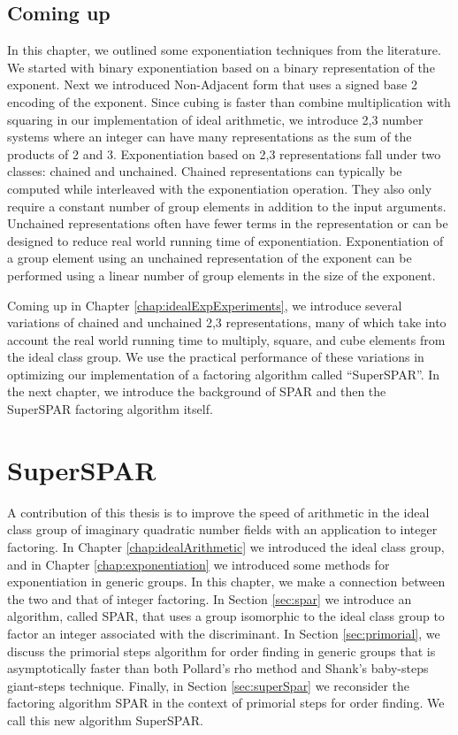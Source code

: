 \documentclass{ucalgthes1}
\theoremstyle{definition}
\begin{document}
\section{Coming up}

In this chapter, we outlined some exponentiation techniques from the literature.  We started with binary exponentiation based on a binary representation of the exponent.  Next we introduced Non-Adjacent form that uses a signed base 2 encoding of the exponent.  Since cubing is faster than combine multiplication with squaring in our implementation of ideal arithmetic, we introduce 2,3 number systems where an integer can have many representations as the sum of the products of 2 and 3.  Exponentiation based on 2,3 representations fall under two classes: chained and unchained.  Chained representations can typically be computed while interleaved with the exponentiation operation.  They also only require a constant number of group elements in addition to the input arguments.  Unchained representations often have fewer terms in the representation or can be designed to reduce real world running time of exponentiation.  Exponentiation of a group element using an unchained representation of the exponent can be performed using a linear number of group elements in the size of the exponent.

Coming up in Chapter \ref{chap:idealExpExperiments}, we introduce several variations of chained and unchained 2,3 representations, many of which take into account the real world running time to multiply, square, and cube elements from the ideal class group.  We use the practical performance of these variations in optimizing our implementation of a factoring algorithm called ``SuperSPAR''.  In the next chapter, we introduce the background of SPAR and then the SuperSPAR factoring algorithm itself.


\chapter{SuperSPAR}
\label{chap:superspar}

A contribution of this thesis is to improve the speed of arithmetic in the ideal class group of imaginary quadratic number fields with an application to integer factoring.  In Chapter \ref{chap:idealArithmetic} we introduced the ideal class group, and in Chapter \ref{chap:exponentiation} we introduced some methods for exponentiation in generic groups.  In this chapter, we make a connection between the two and that of integer factoring.  In Section \ref{sec:spar} we introduce an algorithm, called SPAR, that uses a group isomorphic to the ideal class group to factor an integer associated with the discriminant.  In Section \ref{sec:primorial}, we discuss the primorial steps algorithm for order finding in generic groups that is asymptotically faster than both Pollard's rho method and Shank's baby-steps giant-steps technique.  Finally, in Section \ref{sec:superSpar} we reconsider the factoring algorithm SPAR in the context of primorial steps for order finding.  We call this new algorithm SuperSPAR.
\end{document}
